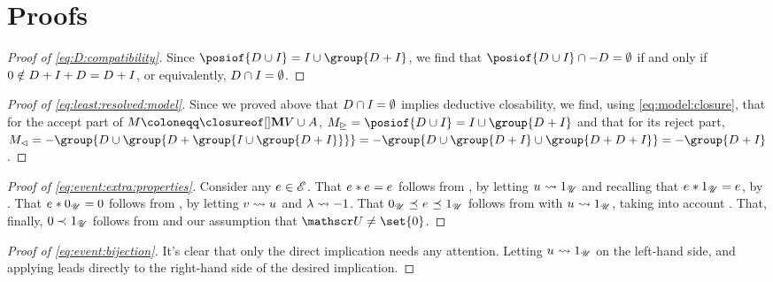 \documentclass[preprint]{isipta2025}
\begin{document}
\appendix

\section{Proofs}

\begin{proof}[Proof of \cref{eq:D:compatibility}]
Since \(\posiof{\desirset\cup\indifset}=\indifset\cup\group{\desirset+\indifset}\), we find that \(\posiof{\desirset\cup\indifset}\cap-\desirset=\emptyset\) if and only if \(0\notin D_{}+I_{}+D_{}=D_{}+I_{}\), or equivalently, \(D_{}\cap I_{}=\emptyset\).
\end{proof}

\begin{proof}[Proof of \cref{eq:least:resolved:model}]
Since we proved above that \(D_{}\cap I_{}=\emptyset\) implies deductive closability, we find, using \cref{eq:model:closure}, that for the accept part of \(\M\coloneqq\Mclsof{\bgM\cup\A}\), \(\M_\acc=\posiof{\desirset\cup\indifset}=\indifset\cup\group{\desirset+\indifset}\) and that for its reject part, \(\M_\rej=-\group{\desirset\cup\group{\desirset+\group{\indifset\cup\group{\desirset+\indifset}}}}=-\group{\desirset\cup\group{\desirset+\indifset}\cup\group{\desirset+\desirset+\indifset}}=-\group{\desirset+\indifset}\).
\end{proof}

\begin{proof}[Proof of \cref{eq:event:extra:properties}]
Consider any \(e_{}\in\mathscr{E}\).
That \(e_{}\ast e_{}=e_{}\) follows from , by letting \(u_{}\rightsquigarrow1_{\mathscr{U}}\) and recalling that \(e_{}\ast1_{\mathscr{U}}=e_{}\), by .
That \(e_{}\ast0_{\mathscr{U}}=0\) follows from , by letting \(v_{}\rightsquigarrow u_{}\) and \(\lambda\rightsquigarrow-1\).
That \(0_{\mathscr{U}}\mathrel{\preceq_{}}e_{}\mathrel{\preceq_{}}1_{\mathscr{U}}\) follows from  with \(u_{}\rightsquigarrow1_{\mathscr{U}}\), taking into account .
That, finally, \(0\mathrel{\prec_{}}1_{\mathscr{U}}\) follows from  and our assumption that \(\opts\neq\set{0}\).
\end{proof}

\begin{proof}[Proof of \cref{eq:event:bijection}]
It's clear that only the direct implication needs any attention.
Letting \(u_{}\rightsquigarrow1_{\mathscr{U}}\) on the left-hand side, and applying  leads directly to the right-hand side of the desired implication.
\end{proof}
\end{document}
